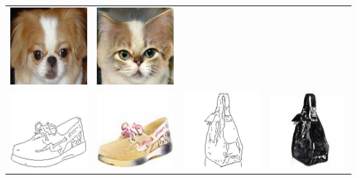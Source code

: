 \documentclass[landscape,a0paper,fontscale=0.285]{baposter} %
\begin{document}
\begin{poster}
{\begin{minipage}{1\linewidth}
\begin{tabular}{cccc}
   \includegraphics[width=.24\textwidth]{figures/others/dog_1035_real_A.jpg}&
  \includegraphics[width=.24\textwidth]{figures/others/dog_1035_fake_B.jpg}\\
  \includegraphics[width=.24\textwidth]{figures/others/1003_real_A.jpg}&
  \includegraphics[width=.24\textwidth]{figures/others/1003_fake_B.jpg}&
 \includegraphics[width=.24\textwidth]{figures/others/100008_real_A.jpg}&
  \includegraphics[width=.24\textwidth]{figures/others/100008_fake_B.jpg} \\

\end{tabular}
\end{minipage}}
\end{poster}
\end{document}
